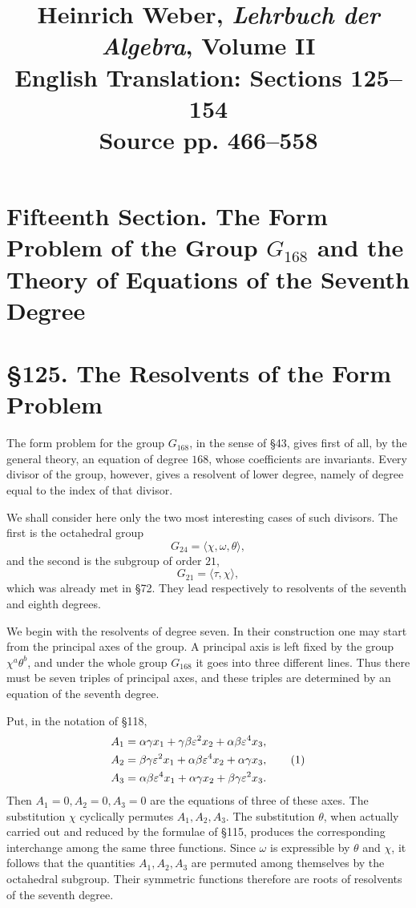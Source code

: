 \documentclass[12pt,a4paper]{article}
\title{Heinrich Weber, \emph{Lehrbuch der Algebra}, Volume II\\English Translation: Sections 125--154\\Source pp. 466--558}
\author{}
\date{}
\newcommand{\webersection}[2]{\clearpage\section*{\S #1. #2}}
\newcommand{\booktitle}[1]{\clearpage\section*{#1}}
\newcommand{\eps}{\varepsilon}
\begin{document}
\maketitle

\booktitle{Fifteenth Section. The Form Problem of the Group \(G_{168}\) and the Theory of Equations of the Seventh Degree}

\webersection{125}{The Resolvents of the Form Problem}

The form problem for the group \(G_{168}\), in the sense of \S 43, gives first of all, by the general theory, an equation of degree \(168\), whose coefficients are invariants.  Every divisor of the group, however, gives a resolvent of lower degree, namely of degree equal to the index of that divisor.

We shall consider here only the two most interesting cases of such divisors.  The first is the octahedral group
\[
 G_{24}=\langle \chi,\omega,\theta\rangle,
\]
and the second is the subgroup of order \(21\),
\[
 G_{21}=\langle \tau,\chi\rangle,
\]
which was already met in \S 72.  They lead respectively to resolvents of the seventh and eighth degrees.

We begin with the resolvents of degree seven.  In their construction one may start from the principal axes of the group.  A principal axis is left fixed by the group \(\chi^a\theta^b\), and under the whole group \(G_{168}\) it goes into three different lines.  Thus there must be seven triples of principal axes, and these triples are determined by an equation of the seventh degree.

Put, in the notation of \S 118,
\begin{align}
 A_1&=\alpha\gamma x_1+\gamma\beta\eps^2x_2+\alpha\beta\eps^4x_3,\notag\\
 A_2&=\beta\gamma\eps^2x_1+\alpha\beta\eps^4x_2+\alpha\gamma x_3,\tag{1}\\
 A_3&=\alpha\beta\eps^4x_1+\alpha\gamma x_2+\beta\gamma\eps^2x_3.\notag
\end{align}
Then \(A_1=0,A_2=0,A_3=0\) are the equations of three of these axes.  The substitution \(\chi\) cyclically permutes \(A_1,A_2,A_3\).  The substitution \(\theta\), when actually carried out and reduced by the formulae of \S 115, produces the corresponding interchange among the same three functions.  Since \(\omega\) is expressible by \(\theta\) and \(\chi\), it follows that the quantities \(A_1,A_2,A_3\) are permuted among themselves by the octahedral subgroup.  Their symmetric functions therefore are roots of resolvents of the seventh degree.
\end{document}
